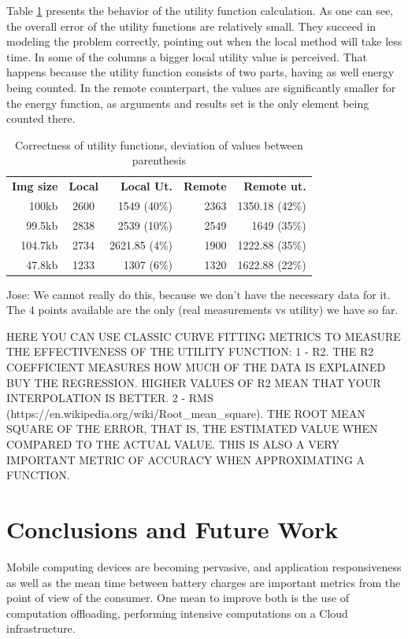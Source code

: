\documentclass[10pt, conference, letterpaper]{IEEEtran}
\begin{document}
Table \ref{table:correctness} presents the behavior of the utility function calculation.  As one can see, the overall error of the utility functions are relatively small. They succeed in modeling the problem correctly, pointing out when the local method will take less time. In some of the columns a bigger local utility value is perceived. That happens because the utility function consists of two parts, having as well energy being counted. In the remote counterpart, the values are significantly smaller for the energy function, as arguments and results set is the only element being counted there.


  \begin{table}[!t]
  \centering
  \caption{Correctness of utility functions, deviation of values between parenthesis}
  \label{table:correctness}
  \begin{tabular}{rcrrr}
    \textbf{ Img size } & \textbf{Local} & \textbf{Local Ut.} & \textbf{Remote} & \textbf{Remote ut.} \\
   100kb & 2600 & 1549 (40\%) & 2363 & 1350.18 (42\%) \\
   99.5kb & 2838  & 2539 (10\%) & 2549 & 1649 (35\%) \\
   104.7kb & 2734  & 2621.85 (4\%) & 1900 & 1222.88 (35\%) \\
   47.8kb & 1233  & 1307 (6\%) & 1320 & 1622.88 (22\%)
  \end{tabular}
  \end{table}

{\color{red}
Jose: We cannot really do this, because we don't have the necessary data for it. The 4 points available are the only (real measurements vs utility) we have so far.

HERE YOU CAN USE CLASSIC CURVE FITTING METRICS TO MEASURE THE EFFECTIVENESS OF THE UTILITY FUNCTION: 1 - R2. THE R2 COEFFICIENT MEASURES HOW MUCH OF THE DATA IS EXPLAINED BUY THE REGRESSION. HIGHER VALUES OF R2 MEAN THAT YOUR INTERPOLATION IS BETTER. 2 - RMS (https://en.wikipedia.org/wiki/Root\_mean\_square). THE ROOT MEAN SQUARE OF THE ERROR, THAT IS, THE ESTIMATED VALUE WHEN COMPARED TO THE ACTUAL VALUE. THIS IS ALSO A VERY IMPORTANT METRIC OF ACCURACY WHEN APPROXIMATING A FUNCTION.}

\section{Conclusions and Future Work}
\label{sec:conclusion}

Mobile computing devices are becoming pervasive, and application responsiveness as well as the mean time between battery charges are important metrics from the point of view of the consumer. One mean to improve both is the use of computation offloading, performing intensive computations on a Cloud infrastructure.
\end{document}
